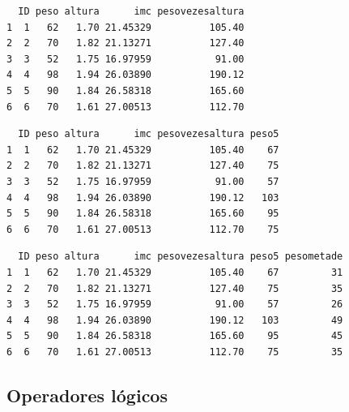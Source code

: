 \documentclass[
  letterpaper,
  DIV=11,
  numbers=noendperiod]{scrreprt}
\newenvironment{Shaded}{\begin{snugshade}}{\end{snugshade}}
\newcommand{\CommentTok}[1]{\textcolor[rgb]{0.37,0.37,0.37}{#1}}
\newcommand{\DecValTok}[1]{\textcolor[rgb]{0.68,0.00,0.00}{#1}}
\newcommand{\NormalTok}[1]{\textcolor[rgb]{0.00,0.23,0.31}{#1}}
\newcommand{\OtherTok}[1]{\textcolor[rgb]{0.00,0.23,0.31}{#1}}
\newcommand{\SpecialCharTok}[1]{\textcolor[rgb]{0.37,0.37,0.37}{#1}}
\begin{document}
\begin{verbatim}
  ID peso altura      imc pesovezesaltura
1  1   62   1.70 21.45329          105.40
2  2   70   1.82 21.13271          127.40
3  3   52   1.75 16.97959           91.00
4  4   98   1.94 26.03890          190.12
5  5   90   1.84 26.58318          165.60
6  6   70   1.61 27.00513          112.70
\end{verbatim}

\begin{Shaded}
\end{Shaded}

\begin{verbatim}
  ID peso altura      imc pesovezesaltura peso5
1  1   62   1.70 21.45329          105.40    67
2  2   70   1.82 21.13271          127.40    75
3  3   52   1.75 16.97959           91.00    57
4  4   98   1.94 26.03890          190.12   103
5  5   90   1.84 26.58318          165.60    95
6  6   70   1.61 27.00513          112.70    75
\end{verbatim}

\begin{Shaded}
\end{Shaded}

\begin{verbatim}
  ID peso altura      imc pesovezesaltura peso5 pesometade
1  1   62   1.70 21.45329          105.40    67         31
2  2   70   1.82 21.13271          127.40    75         35
3  3   52   1.75 16.97959           91.00    57         26
4  4   98   1.94 26.03890          190.12   103         49
5  5   90   1.84 26.58318          165.60    95         45
6  6   70   1.61 27.00513          112.70    75         35
\end{verbatim}

\hypertarget{operadores-luxf3gicos}{%
\subsection{Operadores lógicos}\label{operadores-luxf3gicos}}
\end{document}
